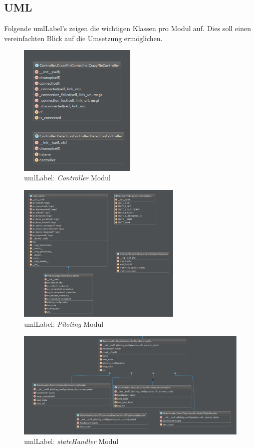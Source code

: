 \subsection{UML}
Folgende \gls{umlLabel}'s zeigen die wichtigen Klassen pro Modul auf. Dies soll einen vereinfachten Blick auf die Umsetzung ermöglichen.

\begin{figure}[H]
	\centering
	\includegraphics[width=0.5\textwidth]{figures/poc/uml/controller.png}
	\caption{\gls{umlLabel}: \textit{Controller} Modul}
\end{figure}

\begin{figure}[H]
	\centering
	\includegraphics[width=0.7\textwidth]{figures/poc/uml/piloting.png}
	\caption{\gls{umlLabel}: \textit{Piloting} Modul}
\end{figure}

\begin{figure}[H]
	\centering
	\includegraphics[width=1.0\textwidth]{figures/poc/uml/stateHandler.png}
	\caption{\gls{umlLabel}: \textit{stateHandler} Modul}
\end{figure}


